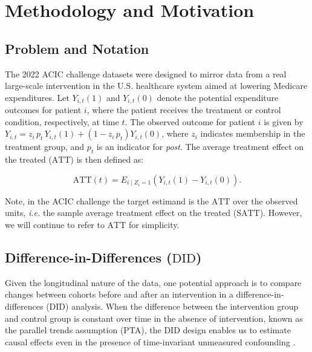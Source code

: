 \documentclass[twoside,11pt]{article}
\makeatletter
\newcommand*{\DID}{\ensuremath{\text{DID}}\xspace}
\newcommand*{\ATT}{\ensuremath{\text{ATT}}\xspace}
\newcommand*{\SATT}{\ensuremath{\text{SATT}}\xspace}
\newcommand*{\ie}{\textit{i.e.}\@\xspace}
\makeatother
\begin{document}
\section{Methodology and Motivation}
\label{method}

\subsection{Problem and Notation}
\label{method:notation}

The 2022 ACIC challenge datasets were designed to mirror data from
a real large-scale intervention in the U.S. healthcare system aimed at lowering Medicare expenditures.
Let $Y_{i,t}(1)$ and $Y_{i,t}(0)$ denote the potential expenditure outcomes for patient $i$,
where the patient receives the treatment or control condition, respectively, at time $t$.
The observed outcome for patient $i$ is given by
$Y_{i,t} = z_{i} \, p_{t} \, Y_{i,t}(1) + \left(1-z_{i} \, p_{t}\right) Y_{i,t}(0)$,
where $z_{i}$ indicates membership in the treatment group,
and $p_{t}$ is an indicator for \emph{post}.
The average treatment effect on the treated (\ATT) is then defined as:

\begin{equation}\label{eq:ATT}
\ATT\left(t\right) = E_{i \mid Z_{i}=1} \left(Y_{i,t}(1) - Y_{i,t}(0)\right).
\end{equation}

Note, in the ACIC challenge the target estimand is the \ATT over the observed units,
\ie the sample average treatment effect on the treated (\SATT).
However, we will continue to refer to \ATT for simplicity.

\subsection{Difference-in-Differences (\DID)}
\label{method:DID}

Given the longitudinal nature of the data,
one potential approach is to compare changes between cohorts
before and after an intervention in a difference-in-differences (\DID) analysis.
When the difference between the intervention group and control group is
constant over time in the absence of intervention, known as the parallel trends assumption (PTA),
the \DID design enables us to estimate causal effects
even in the presence of time-invariant unmeasured confounding \cite{10.1111/0034-6527.00321}.
\end{document}
